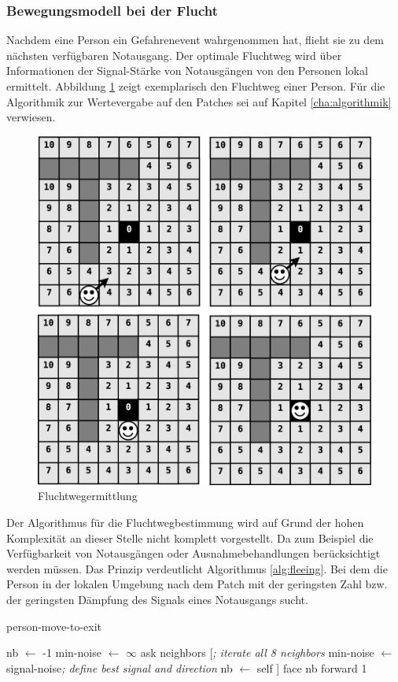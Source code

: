 \subsubsection{Bewegungsmodell bei der Flucht}
\label{sec:move_to_exit}

Nachdem eine Person ein Gefahrenevent wahrgenommen hat, flieht sie zu dem nächsten verfügbaren Notausgang. Der optimale Fluchtweg wird über Informationen der Signal-Stärke von Notausgängen von den Personen lokal ermittelt. Abbildung \ref{fig:fleeing} zeigt exemplarisch den Fluchtweg einer Person. Für die Algorithmik zur Wertevergabe auf den Patches sei auf Kapitel \ref{cha:algorithmik} verwiesen. 

\begin{figure}[!ht]
\centering
\includegraphics[height=0.55\textwidth]{simulationsumgebung/fleeing}
\caption{Fluchtwegermittlung}
\label{fig:fleeing}
\end{figure}

Der Algorithmus für die Fluchtwegbestimmung wird auf Grund der hohen Komplexität an dieser Stelle nicht komplett vorgestellt. Da zum Beispiel die Verfügbarkeit von Notausgängen oder Ausnahmebehandlungen berücksichtigt werden müssen. Das Prinzip verdeutlicht Algorithmus \ref{alg:fleeing}. Bei dem die Person in der lokalen Umgebung nach dem Patch mit der geringsten Zahl bzw. der geringsten Dämpfung des Signals eines Notausgangs sucht. 

\begin{algorithm}
\caption{person-move-to-exit}
\label{alg:fleeing}
\begin{algorithmic} 
\STATE nb $\leftarrow$ -1
\STATE min-noise $\leftarrow$ $\infty$
\STATE ask neighbors [\hfill\emph{; iterate all 8 neighbors}
\STATE min-noise $\leftarrow$ signal-noise\hfill\emph{; define best signal and direction}
\STATE nb $\leftarrow$ self
\ENDIF 
\STATE ]
\STATE face nb
\STATE forward 1
\end{algorithmic}
\end{algorithm}




